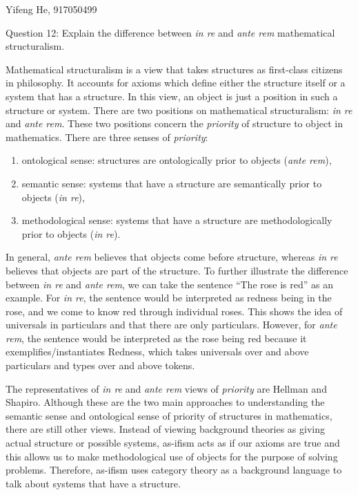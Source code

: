 \documentclass[11pt]{article}
\begin{document}
\begin{center}
Yifeng He, 917050499
\end{center}

\begin{center}
Question 12: Explain the difference between \textit{in re} and \textit{ante rem} mathematical structuralism.
\end{center}

Mathematical structuralism is a view that takes structures as first-class citizens in philosophy.
It accounts for axioms which define either the structure itself or a system that has a structure.
In this view, an object is just a position in such a structure or system.
There are two positions on mathematical structuralism: \textit{in re} and \textit{ante rem}.
These two positions concern the \textit{priority} of structure to object in mathematics. There are three senses of \textit{priority}:
\begin{enumerate}
    \item ontological sense: structures are ontologically prior to objects (\textit{ante rem}),
    \item semantic sense: systems that have a structure are semantically prior to objects (\textit{in re}),
    \item methodological sense: systems that have a structure are methodologically prior to objects (\textit{in re}).
\end{enumerate}

In general, \textit{ante rem} believes that objects come before structure,
whereas \textit{in re} believes that objects are part of the structure.
To further illustrate the difference between \textit{in re} and \textit{ante rem},
we can take the sentence ``The rose is red'' as an example.
For \textit{in re}, the sentence would be interpreted as redness being in the rose, and we come to know red through individual roses. 
This shows the idea of universals in particulars and that there are only particulars. 
However, for \textit{ante rem}, the sentence would be interpreted as the rose being red because it exemplifies/instantiates Redness, 
which takes universals over and above particulars and types over and above tokens.

The representatives of \textit{in re} and \textit{ante rem} views of \textit{priority} are Hellman and Shapiro. 
Although these are the two main approaches to understanding 
the semantic sense and ontological sense of priority of structures in mathematics, there are still other views. 
Instead of viewing background theories as giving actual structure or possible systems,
as-ifism acts as if our axioms are true and this allows us to make methodological use of objects for the purpose of solving problems. Therefore, as-ifism uses category theory as a background language to talk about systems that have a structure.
\end{document}
